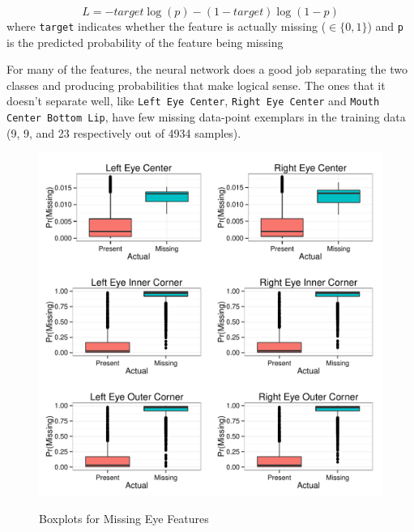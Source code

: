 \documentclass[journal]{IEEEtran}
\begin{document}
\[\label{eq:bin_cross}
 L = -target \log(p) - (1 - target) \log(1 - p)
\]
where \texttt{target} indicates whether the feature is actually missing ($\in \{0,1\}$) and \texttt{p} is the predicted probability of the feature being missing

For many of the features, the neural network does a good job separating the two classes and producing probabilities that make logical sense.  The ones that it doesn't separate well, like \texttt{Left Eye Center}, \texttt{Right Eye Center} and \texttt{Mouth Center Bottom Lip}, have few missing data-point exemplars in the training data (9, 9, and 23 respectively out of 4934 samples).

\begin{figure}[!ht]
  \centering
  \caption{Boxplots for Missing Eye Features}
  \includegraphics[scale=.5]{logistic_boxplots_eye.pdf}
  \label{fig:logistic_boxplots_eye}
\end{figure}
\end{document}
